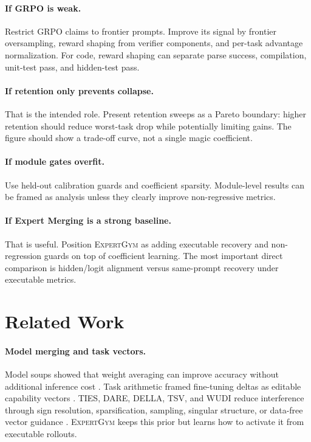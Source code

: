 \documentclass[11pt]{article}
\newcommand{\method}{\textsc{ExpertGym}\xspace}
\begin{document}
\paragraph{If GRPO is weak.}  Restrict GRPO claims to frontier prompts.  Improve its signal by frontier oversampling, reward shaping from verifier components, and per-task advantage normalization.  For code, reward shaping can separate parse success, compilation, unit-test pass, and hidden-test pass.

\paragraph{If retention only prevents collapse.}  That is the intended role.  Present retention sweeps as a Pareto boundary: higher retention should reduce worst-task drop while potentially limiting gains.  The figure should show a trade-off curve, not a single magic coefficient.

\paragraph{If module gates overfit.}  Use held-out calibration guards and coefficient sparsity.  Module-level results can be framed as analysis unless they clearly improve non-regressive metrics.

\paragraph{If Expert Merging is a strong baseline.}  That is useful.  Position \method as adding executable recovery and non-regression guards on top of coefficient learning.  The most important direct comparison is hidden/logit alignment versus same-prompt recovery under executable metrics.

\section{Related Work}

\paragraph{Model merging and task vectors.}  Model soups showed that weight averaging can improve accuracy without additional inference cost \citep{wortsman2022model}.  Task arithmetic framed fine-tuning deltas as editable capability vectors \citep{ilharco2023editing}.  TIES, DARE, DELLA, TSV, and WUDI reduce interference through sign resolution, sparsification, sampling, singular structure, or data-free vector guidance \citep{yadav2023ties,yu2023dare,deep2024della,gargiulo2025tsv,cheng2025wudi}.  \method keeps this prior but learns how to activate it from executable rollouts.
\end{document}
